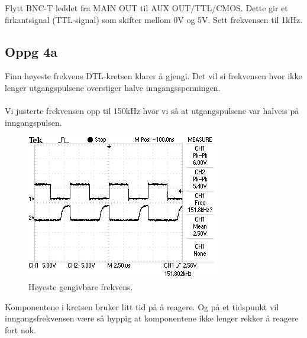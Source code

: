 Flytt BNC-T leddet fra MAIN OUT til AUX OUT/TTL/CMOS.
Dette gir et firkantsignal (TTL-signal) som skifter mellom 0V og 5V.
Sett frekvensen til 1kHz.



\subsection{Oppg 4a}
Finn høyeste frekvens DTL-kretsen klarer å gjengi.
Det vil si frekvensen hvor ikke lenger utgangspulsene overstiger
halve inngangsspenningen.
\\\\
Vi justerte frekvensen opp til 150kHz hvor vi så at utgangspulsene var halveis
på inngangspulsen.
\begin{figure}[H]
  \caption{Høyeste gengivbare frekvens.}
  \centering
    \includegraphics[width=\textwidth]{4a.jpg}
\end{figure}
Komponentene i kretsen bruker litt tid på å reagere.
Og på et tidspunkt vil inngangsfrekvensen være så hyppig at komponentene
ikke lenger rekker å reagere fort nok.



